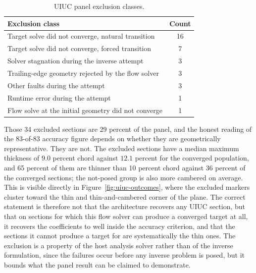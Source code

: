 \begin{table}[htbp]
\centering
\caption{UIUC panel exclusion classes.}
\label{tab:uiuc-exclusions}
\begin{tabularx}{\textwidth}{@{}L c@{}}
\toprule
Exclusion class & Count \\
\midrule
Target solve did not converge, natural transition & 16 \\
Target solve did not converge, forced transition & 7 \\
Solver stagnation during the inverse attempt & 3 \\
Trailing-edge geometry rejected by the flow solver & 3 \\
Other faults during the attempt & 3 \\
Runtime error during the attempt & 1 \\
Flow solve at the initial geometry did not converge & 1 \\
\bottomrule
\end{tabularx}
\end{table}

Those 34 excluded sections are 29 percent of the panel, and the honest reading
of the 83-of-83 accuracy figure depends on whether they are geometrically
representative. They are not. The excluded sections have a median maximum
thickness of $9.0$ percent chord against $12.1$ percent for the converged
population, and 65 percent of them are thinner than 10 percent chord against
36 percent of the converged sections; the not-posed group is also more
cambered on average. This is visible directly in
Figure~\ref{fig:uiuc-outcomes}, where the excluded markers cluster toward the
thin and thin-and-cambered corner of the plane. The correct statement is
therefore not that the architecture recovers any UIUC section, but that on
sections for which this flow solver can produce a converged target at all, it
recovers the coefficients to well inside the accuracy criterion, and that the
sections it cannot produce a target for are systematically the thin ones. The
exclusion is a property of the host analysis solver rather than of the inverse
formulation, since the failures occur before any inverse problem is posed, but
it bounds what the panel result can be claimed to demonstrate.

